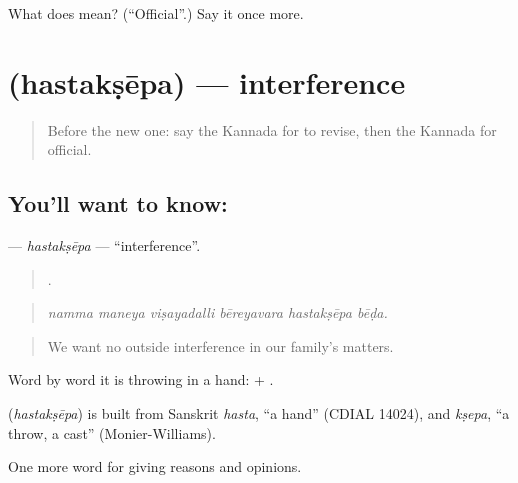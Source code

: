 \begin{tcolorbox}[breakable,colback=teal!4,colframe=teal!35!black,title={Before you move on}]
What does  mean? (\textquotedblleft{}Official\textquotedblright{}.) Say it once more.
\end{tcolorbox}
\section[\texorpdfstring{\kn{ಹಸ್ತಕ್ಷೇಪ} (hastakṣēpa)}{ಹಸ್ತಕ್ಷೇಪ (hastakṣēpa)}]{ (hastakṣēpa) — interference}

\label{lesson:KA-C390-hastaksepa}



\begin{quote}
Before the new one: say the Kannada for to revise, then the Kannada for official.
\end{quote}

\subsection*{You'll want to know: }
\textbf{} — \emph{hastakṣēpa} — \textquotedblleft{}interference\textquotedblright{}.

\begin{quote}
     .
\end{quote}

\begin{quote}
\emph{namma maneya viṣayadalli bēreyavara hastakṣēpa bēḍa.}
\end{quote}

\begin{quote}
We want no outside interference in our family's matters.
\end{quote}

Word by word it is throwing in a hand:  + .

\begin{cousinweb}
\textbf{} (\emph{hastakṣēpa}) is built from Sanskrit \emph{hasta}, \textquotedblleft{}a hand\textquotedblright{} (CDIAL 14024), and \emph{kṣepa}, \textquotedblleft{}a throw, a cast\textquotedblright{} (Monier-Williams).
\end{cousinweb}

\begin{grammarlens}[title={What you've built}]
One more word for giving reasons and opinions.
\end{grammarlens}

